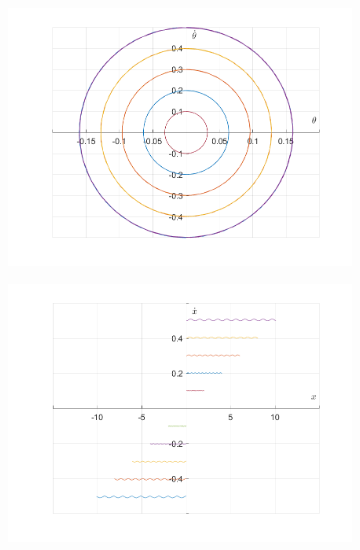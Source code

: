 \documentclass{article}
\begin{document}
	\begin{figure}[h!]
		\centering
		\begin{subfigure}[b]{0.48\linewidth}
			\includegraphics[width=\linewidth]{./SmallOscillations/S7/F5.png}
		\end{subfigure}
		\begin{subfigure}[b]{0.48\linewidth}
			\includegraphics[width=\linewidth]{./SmallOscillations/S7/F6.png}
		\end{subfigure}
	\end{figure}
	\newpage
	
\end{document}
